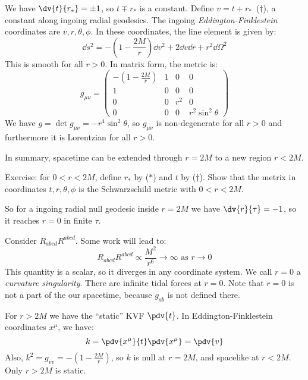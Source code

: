 \documentclass{jknotes}
\begin{document}
\begin{wrapfigure}{l}{0.3\linewidth}
    \centering
\end{wrapfigure}
We have \(\dv{t}{r_*} = \pm1\), so \(t\mp r_*\) is a constant. Define \mbox{\(v = t + r_*\) (\(\dagger\))}, a constant along ingoing radial geodesics. The ingoing \emph{Eddington-Finklestein} coordinates are \(v,r,\theta,\phi\). In these coordinates, the line element is given by:
\begin{equation}
    \dd{s}^2 = - \left( 1-\frac{2M}{r} \right)\dd{v}^2 + 2\dd{v}\dd{r} + r^2\dd{\Omega}^2
\end{equation}
This is smooth for all \(r > 0\). In matrix form, the metric is:
\begin{equation}
    g_{\mu\nu} = 
    \begin{pmatrix}
        - \left( 1 - \frac{2M}{r} \right) & 1 & 0 & 0 \\
        1 & 0 & 0 & 0 \\
        0 & 0 & r^2 & 0 \\
        0 & 0 & 0 & r^2\sin^2\theta
    \end{pmatrix}
\end{equation}
We have \(g = \det g_{\mu\nu} = -r^4\sin^2\theta\), so \(g_{\mu\nu}\) is non-degenerate for all \(r > 0\) and furthermore it is Lorentzian for all \(r>0\).

In summary, spacetime can be extended through \(r=2M\) to a new region \(r<2M\).

Exercise: for \(0<r<2M\), define \(r_*\) by (\(*\)) and \(t\) by (\(\dagger\)). Show that the metrix in coordinates \(t,r,\theta,\phi\) is the Schwarzschild metric with \(0<r<2M\).

So for a ingoing radial null geodesic inside \(r=2M\) we have \(\dv{r}{\tau}=-1\), so it reaches \(r=0\) in finite \(\tau\).

Consider \(R_{abcd}R^{abcd}\). Some work will lead to:
\begin{equation}
    R_{abcd}R^{abcd} \propto \frac{M^2}{r^6} \rightarrow \infty \text{ as } r\rightarrow0
\end{equation}
This quantity is a scalar, so it diverges in any coordinate system. We call \(r=0\) a \emph{curvature singularity}. There are infinite tidal forces at \(r=0\). Note that \(r=0\) is not a part of the our spacetime, because \(g_{ab}\) is not defined there.

For \(r>2M\) we have the ``static'' KVF \(\pdv{t}\). In Eddington-Finklestein coordinates \(x^\mu\), we have:
\begin{equation}
    k = \pdv{x^\mu}{t}\pdv{x^\mu} = \pdv{v}
\end{equation}
Also, \(k^2 = g_{vv} = -\left( 1-\frac{2M}{r} \right)\), so \(k\) is null at \(r=2M\), and spacelike at \(r < 2M\). Only \(r > 2M\) is static.
\end{document}

